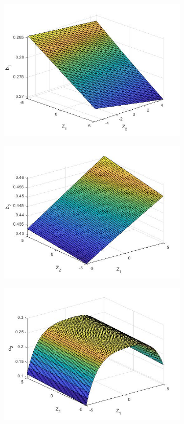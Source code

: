 \documentclass[12pt]{article}
\begin{document}
\begin{figure}[H]
\begin{subfigure}{0.49\textwidth}
\includegraphics[width=0.9\linewidth]{b1_s3.jpg} 
\end{subfigure}
\begin{subfigure}{0.49\textwidth}
\includegraphics[width=0.9\linewidth]{b2_s3.jpg}
\end{subfigure}
\begin{subfigure}{0.49\textwidth}
\includegraphics[width=0.9\linewidth]{alpha2_s3.jpg} 

\end{subfigure}
\end{figure}
\end{document}
